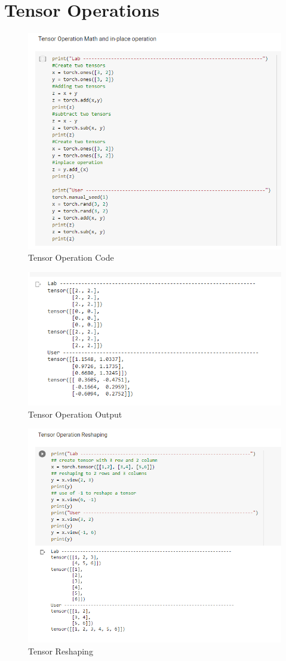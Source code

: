 \documentclass[24pt, letterpaper]{article}
\begin{document}
	\section{Tensor Operations}
		\begin{figure}[ht]
			\centering
			\includegraphics[width=0.7\linewidth]{Lab1Img/TensorOperation_Code}
			\caption{Tensor Operation Code}
			\label{fig:tensoroperationcode}
		\end{figure}
		\begin{figure}[ht]
			\centering
			\includegraphics[width=0.7\linewidth]{Lab1Img/TensorOperation_result}
			\caption{Tensor Operation Output}
			\label{fig:tensoroperationresult}
		\end{figure}	
		\begin{figure}
			\centering
			\includegraphics[width=0.7\linewidth]{Lab1Img/TensorReshaping}
			\caption{Tensor Reshaping}
			\label{fig:tensorreshaping}
		\end{figure}
\end{document}

